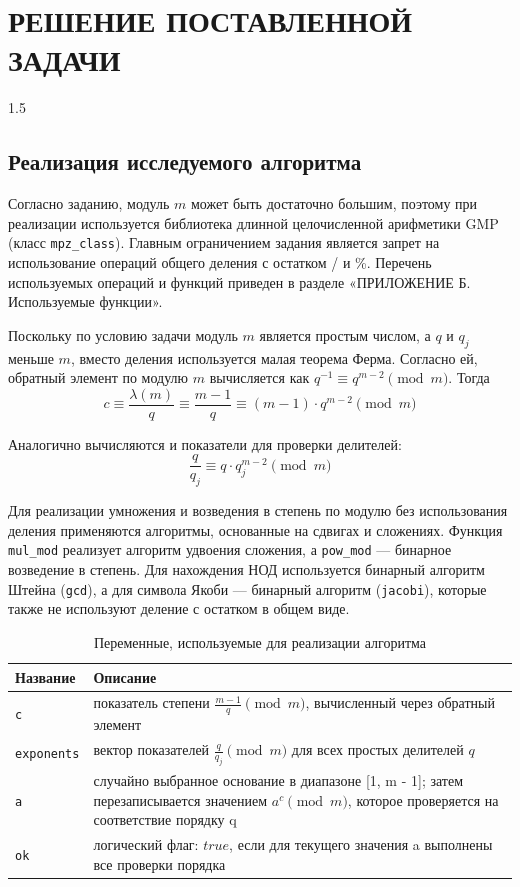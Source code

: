 \documentclass[14pt,a4paper]{extarticle}
\begin{document}
\section{РЕШЕНИЕ ПОСТАВЛЕННОЙ ЗАДАЧИ}
\begin{spacing}{1.5} 
\subsection{Реализация исследуемого алгоритма}
Согласно заданию, модуль \(m\) может быть достаточно большим, поэтому при реализации используется библиотека длинной целочисленной арифметики GMP (класс \texttt{mpz\_class}). Главным ограничением задания является запрет на использование операций общего деления с остатком / и \%. Перечень используемых операций и функций приведен в разделе «ПРИЛОЖЕНИЕ Б. Используемые функции».

Поскольку по условию задачи модуль \(m\) является простым числом, а \(q\) и \(q_j\) меньше \(m\), вместо деления используется малая теорема Ферма. Согласно ей, обратный элемент по модулю \(m\) вычисляется как \(q^{-1} \equiv q^{m-2} \pmod m\).
Тогда
\begin{equation}\tag{2.1}
    c \equiv \frac{\lambda(m)}{q} \equiv \frac{m-1}{q} \equiv (m-1) \cdot q^{m-2} \pmod m
\end{equation}

Аналогично вычисляются и показатели для проверки делителей:
\begin{equation}\tag{2.2}
    \frac{q}{q_j} \equiv q \cdot q_j^{m-2} \pmod m
\end{equation}

Для реализации умножения и возведения в степень по модулю без использования деления применяются алгоритмы, основанные на сдвигах и сложениях. Функция \texttt{mul\_mod} реализует алгоритм удвоения сложения, а \texttt{pow\_mod} — бинарное возведение в степень. Для нахождения НОД используется бинарный алгоритм Штейна (\texttt{gcd}), а для символа Якоби — бинарный алгоритм (\texttt{jacobi}), которые также не используют деление с остатком в общем виде.

\begin{table}[H]
\caption{Переменные, используемые для реализации алгоритма}
\begin{tabularx}{\textwidth}{|l|X|}
\hline
\textbf{Название} & \textbf{Описание} \\
\hline
    \texttt{c} & показатель степени $\frac{m-1}{q} \pmod m$, вычисленный через обратный элемент \\
\hline
    \texttt{exponents} & вектор показателей $\frac{q}{q_j} \pmod m$ для всех простых делителей $q$ \\
\hline
\texttt{a} & случайно выбранное основание в диапазоне [1, m - 1]; затем перезаписывается значением $a^c \pmod m$, которое проверяется на соответствие порядку q \\
\hline
\texttt{ok} & логический флаг: $true$, если для текущего значения a выполнены все проверки порядка \\
\hline
\end{tabularx}
\end{table}


\end{spacing}
\end{document}
